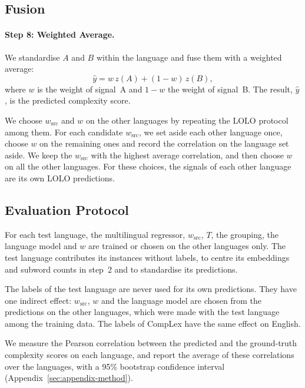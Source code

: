 \documentclass[11pt]{article}
\begin{document}
\subsection{Fusion}
\label{sec:fusion}

\paragraph{Step 8: Weighted Average.} We standardise $A$ and $B$ within the language and fuse them
with a weighted average:
\begin{equation}
\hat{y} = w\, z(A) + (1 - w)\, z(B),
\label{eq:fusion}
\end{equation}
where $w$ is the weight of signal~A and $1 - w$ the weight of signal~B. The result, $\hat{y}$, is %
the predicted
complexity score.

We choose $w_{\mathrm{src}}$ and $w$ on the other languages by repeating the LOLO protocol among %
them. For each candidate $w_{\mathrm{src}}$, we set aside each other language once, choose $w$ on
the remaining ones and record the correlation on the language set aside. We keep the
$w_{\mathrm{src}}$ with the highest average correlation, and then choose $w$ on all the other
languages. For these choices, the signals of each other language are its own LOLO predictions. %

\subsection{Evaluation Protocol}
\label{sec:protocol}

For each test language, the multilingual regressor, $w_{\mathrm{src}}$, $T$, the grouping, the
language model and $w$ are trained or chosen on the other languages only. The test language
contributes its instances without labels, to centre its embeddings and subword counts in step~2 and %
to standardise its predictions. %

The labels of the test language are never used for its own predictions. They have one indirect
effect: $w_{\mathrm{src}}$, $w$ and the language model are chosen from the predictions on the other %
languages, which were made with the test language among the training data. The labels of CompLex
have the same effect on English.

We measure the Pearson correlation between the predicted and the ground-truth complexity scores on each %
language, and report the average of these correlations over the languages, with a 95\% bootstrap %
confidence interval (Appendix~\ref{sec:appendix-method}).
\end{document}
